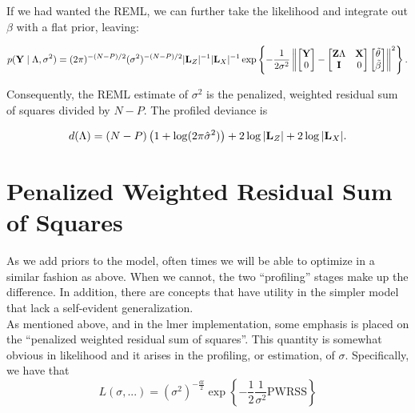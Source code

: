 \documentclass[10pt]{article}
\begin{document}
If we had wanted the REML, we can further take the likelihood and
integrate out $\beta$ with a flat prior, leaving:

\begin{equation*}
p({\bf Y} \mid \Lambda, \sigma^2) = (2\pi)^{-(N-P)/2} (\sigma^2)^{-(N - P) / 2} |{\bf
  L}_Z|^{-1} |{\bf L}_X|^{-1}\exp\left\{-\frac{1}{2\sigma^2}
\left\|
\begin{bmatrix} {\bf Y} \\ 0 \end{bmatrix}
-\begin{bmatrix}{\bf Z}\Lambda & {\bf X} \\ {\bf I} & 0 \end{bmatrix}
\begin{bmatrix}\tilde\theta \\ \tilde\beta\end{bmatrix}
\right\|^2
\right\}.
\end{equation*}

Consequently, the REML estimate of $\sigma^2$ is the penalized,
weighted residual sum of squares divided by $N - P$. The profiled
deviance is

\begin{equation*}
d(\Lambda) = (N - P)\left(1 + \log(2\pi\hat\sigma^2)\right)+2\log|{\bf
  L}_Z| + 2\log|{\bf L}_X|.
\end{equation*}

\newpage

\section*{Penalized Weighted Residual Sum of Squares}

As we add priors to the model, often times we will be able to optimize
in a similar fashion as above. When we cannot, the two
``profiling'' stages make up the difference. In addition, there are
concepts that have utility in the simpler model that lack a self-evident
generalization. \\

As mentioned above, and in the lmer implementation, some emphasis is
placed on the ``penalized weighted residual sum of squares''. This
quantity is somewhat obvious in likelihood and it arises in the
profiling, or estimation, of $\sigma$. Specifically, we have that
\begin{equation*}
L(\sigma, ...) =
(\sigma^2)^{-\frac{\mathrm{df}}{2}}\exp\left\{-\frac{1}{2}\frac{1}{\sigma^2}\mathrm{PWRSS}
\right\}
\end{equation*}
\end{document}
